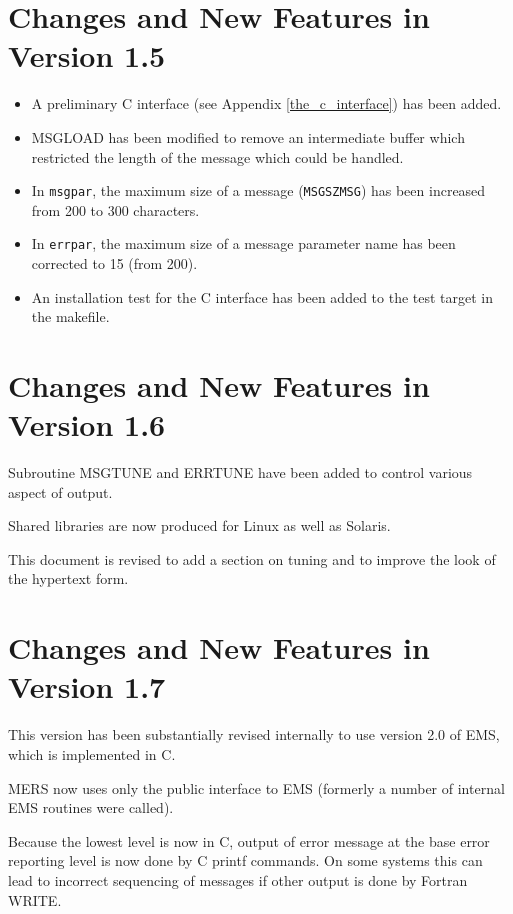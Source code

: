 \documentclass[twoside,11pt]{article}
\newcommand{\htmlref}[2]{#1}
\newcommand{\latex}[1]{#1}
\newcommand{\xref}[3]{#1}
\newcommand{\xlabel}[1]{}
\renewcommand{\_}{\texttt{\symbol{95}}}
\begin{document}
\section{\xlabel{changes_and_new_features_in_version_1_5}Changes and New Features in Version 1.5}
\begin{itemize}
\item A preliminary 
\htmlref{C interface}{the_c_interface}\latex{ (see Appendix
\ref{the_c_interface})} has been added.
\item MSG\_LOAD has been modified to remove an intermediate buffer which
restricted the length of the message which could be handled.
\item In \texttt{msg\_par}, the maximum size of a message 
(\texttt{MSG\_\_SZMSG}) has been increased from 200 to 300 characters.
\item In \texttt{err\_par}, the maximum size of a message parameter name has
been corrected to 15 (from 200).
\item An installation test for the C interface has been added to the test
target in the makefile.
\end{itemize}

\section{\xlabel{changes_and_new_features_in_version_1_6}Changes and New Features in Version 1.6}
Subroutine 
\htmlref{MSG\_TUNE}{MSG_TUNE}
and
\htmlref{ERR\_TUNE}{ERR_TUNE}
have been added to control various aspect of output.

Shared libraries are now produced for Linux as well as Solaris.

This document is revised to add a section on 
\htmlref{tuning}{tuning} and to improve the look of the hypertext form.

\section{\xlabel{changes_and_new_features_in_version_1_7}Changes and New Features in Version 1.7}
This version has been substantially revised internally to use version 2.0 of
\xref{EMS}{ssn4}{},
which is implemented in C.

MERS now uses only the public interface to EMS (formerly a number of internal
EMS routines were called).

Because the lowest level is now in C, output of error message at the base
error reporting level is now done by C printf commands. On some systems this
can lead to incorrect sequencing of messages if other output is done by
Fortran WRITE.
\end{document}
